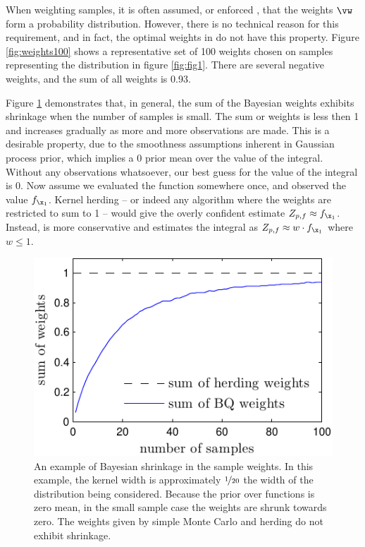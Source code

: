 When weighting samples, it is often assumed, or enforced \citep[as in][]{bach2012equivalence,Song2008}, that the weights $\vw$ form a probability distribution. However, there is no technical reason for this requirement, and in fact, the optimal weights in \bq{} do not have this property. Figure \ref{fig:weights100} shows a representative set of 100 \bq{} weights chosen on samples representing the distribution in figure \ref{fig:fig1}. There are several negative weights, and the sum of all weights is 0.93.

Figure \ref{fig:weights_shrinkage} demonstrates that, in general, the sum of the Bayesian weights exhibits shrinkage when the number of samples is small. The sum or weights is less then 1 and increases gradually as more and more observations are made. This is a desirable property, due to the smoothness assumptions inherent in Gaussian process prior, which implies a $0$ prior mean over the value of the integral. Without any observations whatsoever, our best guess for the value of the integral is $0$. Now assume we evaluated the function somewhere once, and observed the value $f_{\x_1}$. Kernel herding -- or indeed any algorithm where the weights are restricted to sum to 1 -- would give the overly confident estimate $Z_{p,f} \approx f_{\x_1}$. Instead, \bq{} is more conservative and estimates the integral as $Z_{p,f} \approx w\cdot f_{\x_1}$ where $w \leq 1$.

\begin{figure}
	\centering
	\includegraphics[width=.8\columnwidth]{figs/herding/weights_shrinkage}
	
		\caption[The concept of shrinkage in Bayesian quadrature]{An example of Bayesian shrinkage in the sample weights. In this example, the kernel width is approximately $\nicefrac{1}{20}$ the width of the distribution being considered. Because the prior over functions is zero mean, in the small sample case the weights are shrunk towards zero. The weights given by simple Monte Carlo and herding do not exhibit shrinkage. }
	\label{fig:weights_shrinkage}
\end{figure}


